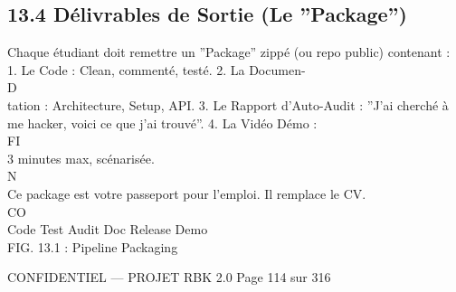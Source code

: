 \documentclass[12pt,landscape,a4paper]{article}
\newenvironment{confidential}
{\begin{tcolorbox}[
    colback=rbkred!5!white,
    colframe=rbkred!75!black,
    title=CONFIDENTIEL,
    fonttitle=\bfseries\color{white},
    coltitle=rbkred!75!black,
    breakable,
    enhanced,
    frame hidden,
    borderline west={2pt}{0pt}{rbkred!75!black}
]}
{\end{tcolorbox}}
\begin{document}
\subsection{13.4 Délivrables de Sortie (Le ”Package”)}
Chaque étudiant doit remettre un ”Package” zippé (ou repo public) contenant : 1. Le Code : Clean, commenté, testé. 2. La Documen-\\
\vspace{0.5em}
\vspace{0.5em}
\vspace{0.5em}
\vspace{0.5em}
D\\
tation : Architecture, Setup, API. 3. Le Rapport d’Auto-Audit : ”J’ai cherché à me hacker, voici ce que j’ai trouvé”. 4. La Vidéo Démo :\\
\vspace{0.5em}
\vspace{0.5em}
\vspace{0.5em}
\vspace{0.5em}
FI\\
3 minutes max, scénarisée.\\
\vspace{0.5em}
N\\
Ce package est votre passeport pour l’emploi. Il remplace le CV.\\
CO\\
Code         Test       Audit Doc          Release        Demo\\
\vspace{0.5em}
FIG. 13.1 : Pipeline Packaging\\
\vspace{0.5em}
\vspace{0.5em}
\vspace{0.5em}
\vspace{0.5em}
\begin{confidential}CONFIDENTIEL — PROJET RBK 2.0                                   Page 114 sur 316\end{confidential}
\end{document}
